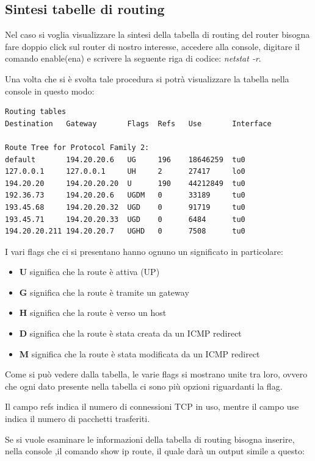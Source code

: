 \subsection{Sintesi tabelle di routing}

Nel caso si voglia visualizzare la sintesi della tabella di routing del router bisogna fare doppio click sul router di nostro interesse, accedere alla console, digitare il comando enable(ena) e scrivere la seguente riga di codice: \emph{netstat -r}.

Una volta che si è svolta tale procedura si potrà visualizzare la tabella nella console in questo modo:

\begin{verbatim}
Routing tables
Destination   Gateway       Flags  Refs   Use       Interface

Route Tree for Protocol Family 2:
default       194.20.20.6   UG     196    18646259  tu0
127.0.0.1     127.0.0.1     UH     2      27417     lo0
194.20.20     194.20.20.20  U      190    44212849  tu0
192.36.73     194.20.20.6   UGDM   0      33189     tu0
193.45.68     194.20.20.32  UGD    0      91719     tu0
193.45.71     194.20.20.33  UGD    0      6484      tu0
194.20.20.211 194.20.20.7   UGHD   0      7508      tu0
\end{verbatim}

\noindent I vari flags che ci si presentano hanno ognuno un significato in particolare:

\begin{itemize}
    \item \textbf{U} significa che la route è attiva (UP)
    \item \textbf{G} significa che la route è tramite un gateway
    \item \textbf{H} significa che la route è verso un host
    \item \textbf{D} significa che la route è stata creata da un ICMP redirect
    \item \textbf{M} significa che la route è stata modificata da un ICMP redirect
\end{itemize}

Come si può vedere dalla tabella, le varie flags si mostrano unite tra loro, ovvero che ogni dato presente nella tabella ci sono più opzioni riguardanti la flag.

Il campo refs indica il numero di connessioni TCP in uso, mentre il campo use indica il numero di pacchetti trasferiti.

Se si vuole esaminare le informazioni della tabella di routing bisogna inserire, nella console ,il comando show ip route, il quale darà un output simile a questo:

